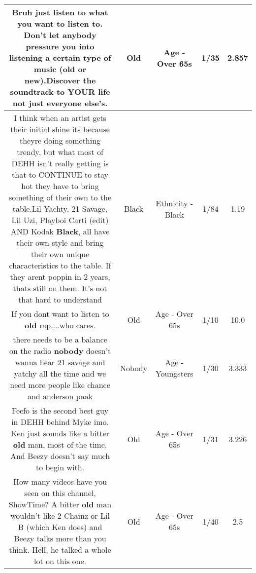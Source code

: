 \documentclass[11pt]{article}
\newlength\mylength
\begin{document}
\begin{center}
\begin{longtable}{|C{.65\mylength}|C{.30\mylength}|C{.12\mylength}|C{.12\mylength}|C{.12\mylength}|}
  \small Bruh just listen to what you want to listen to. Don't let anybody pressure you into listening a certain type of music (\textbf{old} or new).Discover the soundtrack to YOUR life not just  everyone else's.\normalsize   & Old & Age - Over 65s & 1/35 & 2.857 \\  \hline
  \small I think when an artist gets their initial shine its because theyre doing something trendy, but what most of DEHH isn't really getting is that to CONTINUE to stay hot they have to bring something of their own to the table.Lil Yachty, 21 Savage, Lil Uzi, Playboi Carti (edit) AND Kodak \textbf{Black}, all have their own style and bring their own unique characteristics to the table. If they arent poppin in 2 years, thats still on them. It's not that hard to understand\normalsize   & Black & Ethnicity - Black & 1/84 & 1.19 \\  \hline
  \small If you dont want to listen to \textbf{old} rap....who cares.\normalsize   & Old & Age - Over 65s & 1/10 & 10.0 \\  \hline
  \small there needs to be a balance on the radio \textbf{nobody} doesn't wanna hear 21 savage and yatchy all the time and we need more people like chance and anderson paak\normalsize   & Nobody & Age - Youngsters & 1/30 & 3.333 \\  \hline
  \small Feefo is the second best guy in DEHH behind Myke imo. Ken just sounds like a bitter \textbf{old} man, most of the time. And Beezy doesn't say much to begin with.\normalsize   & Old & Age - Over 65s & 1/31 & 3.226 \\  \hline
  \small How many videos have you seen on this channel, ShowTime? A bitter \textbf{old} man wouldn't like 2 Chainz or Lil B (which Ken does) and Beezy talks more than you think. Hell, he talked a whole lot on this one.\normalsize   & Old & Age - Over 65s & 1/40 & 2.5 \\  \hline

\end{longtable}
\end{center}
\end{document}
